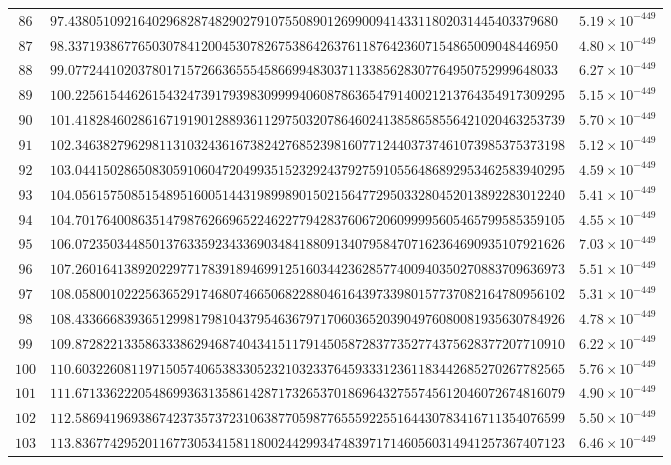 \documentclass[12pt,reqno]{amsart}
\theoremstyle{remark}
\begin{document}
\begin{longtable}{clc}
$86$ & $97.4380510921640296828748290279107550890126990094143311802031445403379680$ & $5.19\times 10^{-449}$ \\
$87$ & $98.3371938677650307841200453078267538642637611876423607154865009048446950$ & $4.80\times 10^{-449}$ \\
$88$ & $99.0772441020378017157266365554586699483037113385628307764950752999648033$ & $6.27\times 10^{-449}$ \\
$89$ & $100.2256154462615432473917939830999940608786365479140021213764354917309295$ & $5.15\times 10^{-449}$ \\
$90$ & $101.4182846028616719190128893611297503207864602413858658556421020463253739$ & $5.70\times 10^{-449}$ \\
$91$ & $102.3463827962981131032436167382427685239816077124403737461073985375373198$ & $5.12\times 10^{-449}$ \\
$92$ & $103.0441502865083059106047204993515232924379275910556486892953462583940295$ & $4.59\times 10^{-449}$ \\
$93$ & $104.0561575085154895160051443198998901502156477295033280452013892283012240$ & $5.41\times 10^{-449}$ \\
$94$ & $104.7017640086351479876266965224622779428376067206099995605465799585359105$ & $4.55\times 10^{-449}$ \\
$95$ & $106.0723503448501376335923433690348418809134079584707162364690935107921626$ & $7.03\times 10^{-449}$ \\
$96$ & $107.2601641389202297717839189469912516034423628577400940350270883709636973$ & $5.51\times 10^{-449}$ \\
$97$ & $108.0580010222563652917468074665068228804616439733980157737082164780956102$ & $5.31\times 10^{-449}$ \\
$98$ & $108.4336668393651299817981043795463679717060365203904976080081935630784926$ & $4.78\times 10^{-449}$ \\
$99$ & $109.8728221335863338629468740434151179145058728377352774375628377207710910$ & $6.22\times 10^{-449}$ \\
$100$ & $110.6032260811971505740653833052321032337645933312361183442685270267782565$ & $5.76\times 10^{-449}$ \\
$101$ & $111.6713362220548699363135861428717326537018696432755745612046072674816079$ & $4.90\times 10^{-449}$ \\
$102$ & $112.5869419693867423735737231063877059877655592255164430783416711354076599$ & $5.50\times 10^{-449}$ \\
$103$ & $113.8367742952011677305341581180024429934748397171460560314941257367407123$ & $6.46\times 10^{-449}$ \\

\end{longtable}
\end{document}
